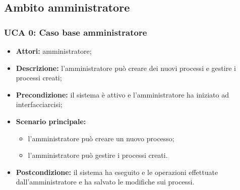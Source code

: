 \subsection{Ambito amministratore}

\iffalse  %
\paragraph{UCA 1:}
\begin{itemize}
\item \textbf{Attori:} amministratore;
\item \textbf{Descrizione:} 
\item \textbf{Precondizione:} 
\item \textbf{Scenario principale:} 
\begin{itemize}
\item 
\end{itemize}
\item \textbf{Postcondizione:}
\end{itemize}
\fi

\subsubsection{UCA 0: Caso base amministratore}
\begin{itemize}
\item \textbf{Attori:} amministratore;
\item \textbf{Descrizione:} l'amministratore può creare dei nuovi processi e gestire i processi creati;
\item \textbf{Precondizione:} il sistema è attivo e l'amministratore ha iniziato ad interfacciarcisi;
\item \textbf{Scenario principale:} 
\begin{itemize}
\item l'amministratore può creare un nuovo processo;
\item l'amministratore può gestire i processi creati.
\end{itemize}
\item \textbf{Postcondizione:} il sistema ha eseguito e le operazioni effettuate dall'amministratore e ha salvato le modifiche sui processi.
\end{itemize}

